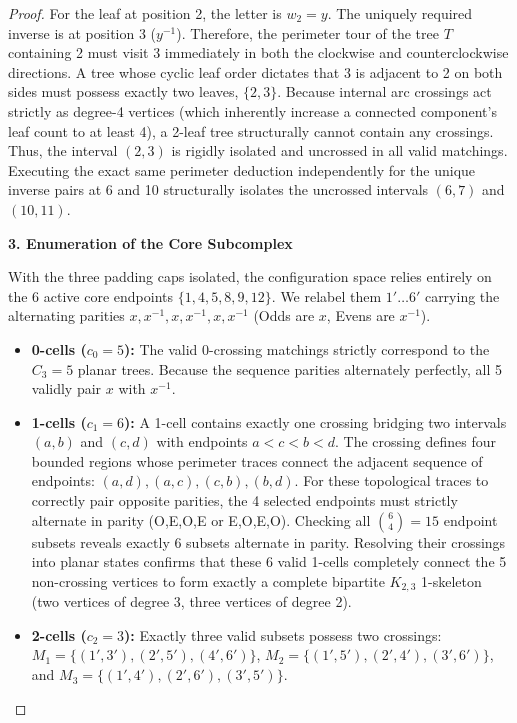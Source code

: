 \documentclass[12pt]{article}
\begin{document}
\begin{proof}
For the leaf at position 2, the letter is $w_2 = y$. The uniquely required inverse is at position 3 ($y^{-1}$). Therefore, the perimeter tour of the tree $T$ containing 2 must visit 3 immediately in both the clockwise and counterclockwise directions. A tree whose cyclic leaf order dictates that 3 is adjacent to 2 on both sides must possess exactly two leaves, $\{2,3\}$. Because internal arc crossings act strictly as degree-4 vertices (which inherently increase a connected component's leaf count to at least 4), a 2-leaf tree structurally cannot contain any crossings. Thus, the interval $(2,3)$ is rigidly isolated and uncrossed in all valid matchings. Executing the exact same perimeter deduction independently for the unique inverse pairs at 6 and 10 structurally isolates the uncrossed intervals $(6,7)$ and $(10,11)$.

\vspace{1em}
\noindent\textbf{3. Enumeration of the Core Subcomplex}

With the three padding caps isolated, the configuration space relies entirely on the 6 active core endpoints $\{1, 4, 5, 8, 9, 12\}$. We relabel them $1' \dots 6'$ carrying the alternating parities $x, x^{-1}, x, x^{-1}, x, x^{-1}$ (Odds are $x$, Evens are $x^{-1}$).
\begin{itemize}
    \item \textbf{0-cells ($c_0=5$):} The valid 0-crossing matchings strictly correspond to the $C_3 = 5$ planar trees. Because the sequence parities alternately perfectly, all 5 validly pair $x$ with $x^{-1}$.
    \item \textbf{1-cells ($c_1=6$):} A 1-cell contains exactly one crossing bridging two intervals $(a,b)$ and $(c,d)$ with endpoints $a < c < b < d$. The crossing defines four bounded regions whose perimeter traces connect the adjacent sequence of endpoints: $(a,d), (a,c), (c,b), (b,d)$. For these topological traces to correctly pair opposite parities, the 4 selected endpoints must strictly alternate in parity (O,E,O,E or E,O,E,O). Checking all $\binom{6}{4}=15$ endpoint subsets reveals exactly 6 subsets alternate in parity. Resolving their crossings into planar states confirms that these 6 valid 1-cells completely connect the 5 non-crossing vertices to form exactly a complete bipartite $K_{2,3}$ 1-skeleton (two vertices of degree 3, three vertices of degree 2).
    \item \textbf{2-cells ($c_2=3$):} Exactly three valid subsets possess two crossings: $M_1 = \{(1',3'), (2',5'), (4',6')\}$, $M_2 = \{(1',5'), (2',4'), (3',6')\}$, and $M_3 = \{(1',4'), (2',6'), (3',5')\}$. 
    

\end{itemize}
\end{proof}
\end{document}
